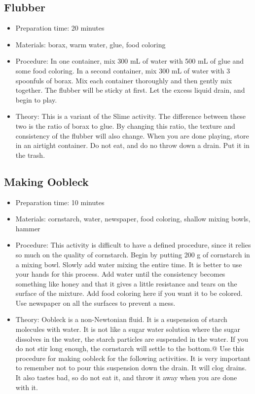 \subsection{Flubber}
\begin{itemize}
\item{Preparation time: 20 minutes}
\item{Materials: borax, warm water, glue, food coloring}
\item{Procedure: In one container, mix 300 mL of water with 500 mL of glue and some food coloring. In a second container, mix 300 mL of water with 3 spoonfuls of borax. Mix each container thoroughly and then gently mix together. The flubber will be sticky at first. Let the excess liquid drain, and begin to play.}
\item{Theory: This is a variant of the Slime activity. The difference between these two is the ratio of borax to glue. By changing this ratio, the texture and consistency of the flubber will also change. When you are done playing, store in an airtight container. Do not eat, and do no throw down a drain. Put it in the trash.}
\end{itemize}

\subsection{Making Oobleck}
\begin{itemize}
\item{Preparation time: 10 minutes}
\item{Materials: cornstarch, water, newspaper, food coloring, shallow mixing bowls, hammer}
\item{Procedure: This activity is difficult to have a defined procedure, since it relies so much on the quality of cornstarch. Begin by putting 200 g of cornstarch in a mixing bowl. Slowly add water mixing the entire time. It is better to use your hands for this process. Add water until the consistency becomes something like honey and that it gives a little resistance and tears on the surface of the mixture. Add food coloring here if you want it to be colored. Use newspaper on all the surfaces to prevent a mess.}
\item{Theory: Oobleck is a non-Newtonian fluid. It is a suspension of starch molecules with water. It is not like a sugar water solution where the sugar dissolves in the water, the starch particles are suspended in the water. If you do not stir long enough, the cornstarch will settle to the bottom.@	Use this procedure for making oobleck for the following activities. It is very important to remember not to pour this suspension down the drain. It will clog drains. It also tastes bad, so do not eat it, and throw it away when you are done with it.}
\end{itemize}

